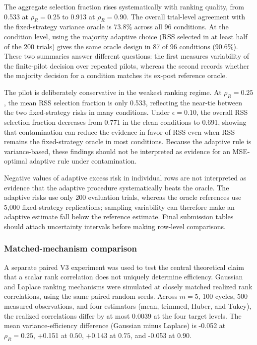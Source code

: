 \documentclass[12pt]{article}
\begin{document}
The aggregate selection fraction rises systematically with ranking quality, from 0.533 at $\rho_R=0.25$ to 0.913 at $\rho_R=0.90$. The overall trial-level agreement with the fixed-strategy variance oracle is 73.8\% across all 96 conditions. At the condition level, using the majority adaptive choice (RSS selected in at least half of the 200 trials) gives the same oracle design in 87 of 96 conditions (90.6\%). These two summaries answer different questions: the first measures variability of the finite-pilot decision over repeated pilots, whereas the second records whether the majority decision for a condition matches its ex-post reference oracle.

The pilot is deliberately conservative in the weakest ranking regime. At $\rho_R=0.25$, the mean RSS selection fraction is only 0.533, reflecting the near-tie between the two fixed-strategy risks in many conditions. Under $\epsilon=0.10$, the overall RSS selection fraction decreases from 0.771 in the clean conditions to 0.691, showing that contamination can reduce the evidence in favor of RSS even when RSS remains the fixed-strategy oracle in most conditions. Because the adaptive rule is variance-based, these findings should not be interpreted as evidence for an MSE-optimal adaptive rule under contamination.

Negative values of adaptive excess risk in individual rows are not interpreted as evidence that the adaptive procedure systematically beats the oracle. The adaptive risks use only 200 evaluation trials, whereas the oracle references use 5,000 fixed-strategy replications; sampling variability can therefore make an adaptive estimate fall below the reference estimate. Final submission tables should attach uncertainty intervals before making row-level comparisons.

\subsubsection{Matched-mechanism comparison}
A separate paired V3 experiment was used to test the central theoretical claim that a scalar rank correlation does not uniquely determine efficiency. Gaussian and Laplace ranking mechanisms were simulated at closely matched realized rank correlations, using the same paired random seeds. Across $m=5$, 100 cycles, 500 measured observations, and four estimators (mean, trimmed, Huber, and Tukey), the realized correlations differ by at most 0.0039 at the four target levels. The mean variance-efficiency difference (Gaussian minus Laplace) is -0.052 at $\rho_R=0.25$, +0.151 at $0.50$, +0.143 at $0.75$, and -0.053 at $0.90$.
\end{document}
